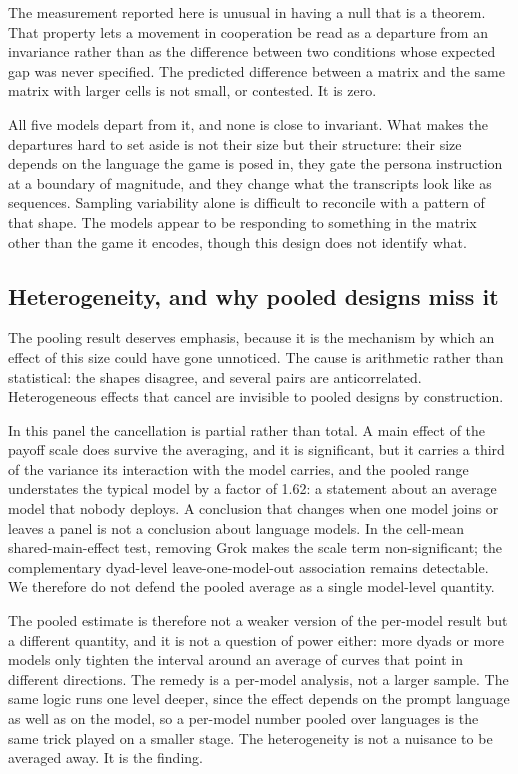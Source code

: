 \documentclass[openacc]{rsproca_new}
\begin{document}
The measurement reported here is unusual in having a null that is a theorem.
That property lets a movement in cooperation be read as a departure from an
invariance rather than as the difference between two conditions whose expected
gap was never specified. The predicted difference between a matrix and the same
matrix with larger cells is not small, or contested. It is zero.

All five models depart from it, and none is close to invariant. What makes the
departures hard to set aside is not their size but their structure: their size
depends on the language the game is posed in, they gate the persona instruction
at a boundary of magnitude, and they change what the transcripts look like as
sequences. Sampling variability alone is difficult to reconcile with a pattern
of that shape. The models appear to be responding to something in the matrix
other than the game it encodes, though this design does not identify what.

\subsection{Heterogeneity, and why pooled designs miss it}\label{sec:disc_pooling}

The pooling result deserves emphasis, because it is the mechanism by which an
effect of this size could have gone unnoticed. The cause is arithmetic rather
than statistical: the shapes disagree, and several pairs are anticorrelated.
Heterogeneous effects that cancel are invisible to pooled designs by
construction.

In this panel the cancellation is partial rather than total. A main effect of
the payoff scale does survive the averaging, and it is significant, but it
carries a third of the variance its interaction with the model carries, and the
pooled range understates the typical model by a factor of 1.62: a statement
about an average model that nobody deploys. A conclusion that changes when one
model joins or leaves a panel is not a conclusion about language models. In the
cell-mean shared-main-effect test, removing Grok makes the scale term
non-significant; the complementary dyad-level leave-one-model-out association
remains detectable. We therefore do not defend the pooled average as a single
model-level quantity.

The pooled estimate is therefore not a weaker version of the per-model result
but a different quantity, and it is not a question of power either: more dyads
or more models only tighten the interval around an average of curves that point
in different directions. The remedy is a per-model analysis, not a larger
sample. The same logic runs one level deeper, since the effect depends on the
prompt language as well as on the model, so a per-model number pooled over
languages is the same trick played on a smaller stage. The heterogeneity is not
a nuisance to be averaged away. It is the finding.
\end{document}
